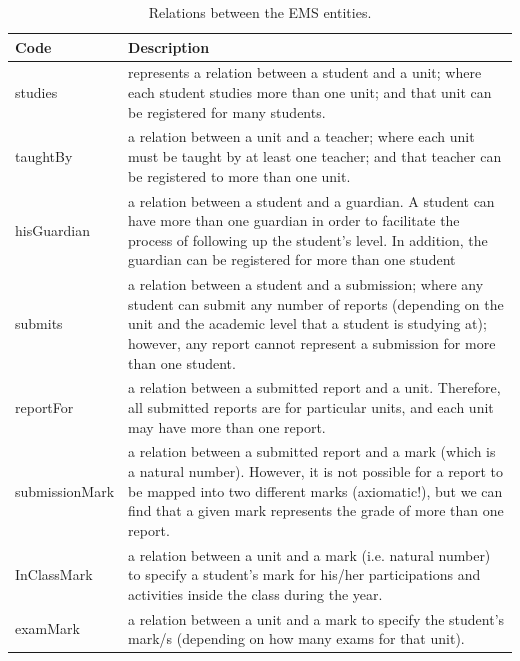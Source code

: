 \begin{table}[bth]
\centering
\caption{Relations between the EMS entities.}
\small
{}
\begin{tabular}{p{0.9 in} p{5.9 in}} \hline 
\hline
Code & Description\\\hline\hline

studies &   represents a relation between a student and a unit; where each student studies more than one unit; and that unit can be registered for many students. \\

taughtBy &  a relation between a unit and a teacher; where each unit must be taught by at least one teacher; and that teacher can be registered to more than one unit.\\

hisGuardian &  a relation between a student and a guardian.  A student can have more than one guardian in order to facilitate the process of following up the student’s level.  In addition, the guardian can be registered for more than one student\\

submits &   a relation between a student and a submission; where any student can submit any number of reports (depending on the unit and the academic level that a student is studying at); however, any report cannot represent a submission for more than one student.\\

reportFor &  a relation between a submitted report and a unit.  Therefore, all submitted reports are for particular units, and each unit may have more than one report. \\

submissionMark &  a relation between a submitted report and a mark (which is a natural number).  However, it is not possible for a report to be mapped into two different marks (axiomatic!), but we can find that a given mark represents the grade of more than one report.\\

InClassMark &  a relation between a unit and a mark (i.e. natural number) to specify a student’s mark for his/her participations and activities inside the class during the year. \\

examMark &  a relation between a unit and a mark to specify the student’s mark/s (depending on how many exams for that unit).\\ 


\end{tabular}
\end{table}
